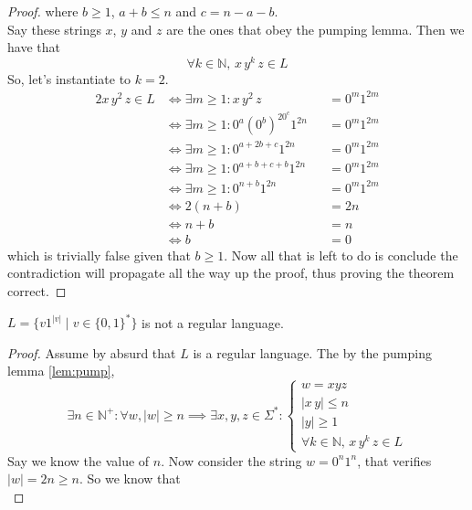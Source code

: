 \documentclass[docid=TP07]{tcom_TP}
\begin{document}
{\begin{proof}
where $b \geq 1$, $a+b \leq n$ and $c=n-a-b$.\\
Say these strings $x$, $y$ and $z$ are the ones that obey the pumping lemma. Then we have that
\begin{equation*}
	\forall k \in \mathbb{N},\,x\,y^k\,z \in L
\end{equation*}
So, let's instantiate to $k=2$.
\begin{alignat*}{2}
	x\,y^2\,z \in L
	& \iff \exists m \geq 1 \colon x\,y^2\,z           &&= 0^m1^{2m} \\
	& \iff \exists m \geq 1 \colon 0^a(0^b)^20^c1^{2n} &&= 0^m1^{2m} \\
	& \iff \exists m \geq 1 \colon 0^{a+2b+c}1^{2n}    &&= 0^m1^{2m} \\
	& \iff \exists m \geq 1 \colon 0^{a+b+c+b}1^{2n}   &&= 0^m1^{2m} \\
	& \iff \exists m \geq 1 \colon 0^{n+b}1^{2n}       &&= 0^m1^{2m} \\
	& \iff 2(n+b)                                      &&= 2n\\
	& \iff n+b                                         &&= n\\
	& \iff b                                           &&= 0
\end{alignat*}
which is trivially false given that $b \geq 1$. Now all that is left to do is conclude the contradiction will propagate all the way up the proof, thus proving the theorem correct.
\end{proof}
\pagebreak
{}
\begin{theorem}
$L=\{v1^{|v|}\mid v \in \{0,1\}^*\}$ is not a regular language.
\end{theorem}
\begin{proof}
Assume  by absurd that $L$ is a regular language. The by the pumping lemma \eqref{lem:pump},
\begin{equation*}
	\exists n \in \mathbb{N}^+ \colon \forall w, |w|\geq n \implies \exists x, y, z \in \Sigma^* \colon 
	\begin{cases}
		w = xyz \\
		|x\,y| \leq n\\
		|y| \geq 1\\
		\forall k \in \mathbb{N},\,x\,y^k\,z \in L
\end{cases}
\end{equation*}
Say we know the value of $n$. Now consider the string $w=0^n1^n$, that verifies $|w|=2n \geq n$. So we know that
\begin{equation*}

\end{equation*}
\end{proof}}
\end{document}
